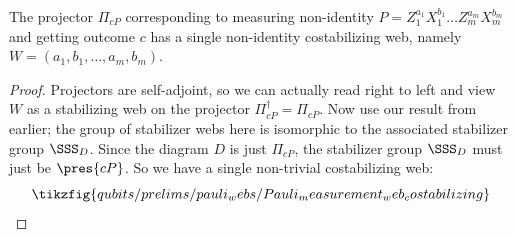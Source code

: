 \begin{lemma}\label{lem:only_costabilizing_web_on_pauli_measurement}
    The projector $\Pi_{cP}$ corresponding to measuring non-identity $P = Z_1^{a_1} X_1^{b_1} \ldots Z_m^{a_m} X_m^{b_m}$ and getting outcome $c$ has a single non-identity costabilizing web, namely $W = (a_1, b_1, \ldots, a_m, b_m)$.
    \begin{proof}
        Projectors are self-adjoint, so we can actually read right to left and view $W$ as a stabilizing web on the projector $\Pi_{cP}^\dagger = \Pi_{cP}$.
        Now use our result from  earlier; the group of stabilizer webs here is isomorphic to the associated stabilizer group $\SSS_D$.
        Since the diagram $D$ is just $\Pi_{cP}$, the stabilizer group $\SSS_D$ must just be $\pres{cP}$.
        So we have a single non-trivial costabilizing web:
        \begin{equation}
            \tikzfig{qubits/prelims/pauli_webs/Pauli_measurement_web_costabilizing}
        \end{equation}
    \end{proof}
\end{lemma}

%
%
%
%
%

